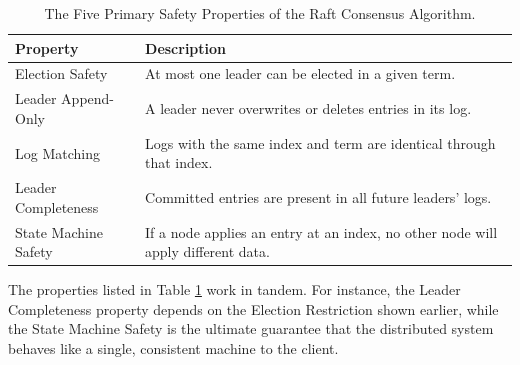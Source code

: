 \begin{table}[h]
\centering
\caption{The Five Primary Safety Properties of the Raft Consensus Algorithm.}
\label{tab:raft_safety_properties}
\begin{tabularx}{\textwidth}{|l|X|}
\hline
\textbf{Property} & \textbf{Description} \\ \hline
Election Safety & At most one leader can be elected in a given term. \\ \hline
Leader Append-Only & A leader never overwrites or deletes entries in its log. \\ \hline
Log Matching & Logs with the same index and term are identical through that index. \\ \hline
Leader Completeness & Committed entries are present in all future leaders' logs. \\ \hline
State Machine Safety & If a node applies an entry at an index, no other node will apply different data. \\ \hline
\end{tabularx}
\end{table}

The properties listed in Table \ref{tab:raft_safety_properties} work in tandem. For instance, the Leader Completeness property depends on the Election Restriction shown earlier, while the State Machine Safety is the ultimate guarantee that the distributed system behaves like a single, consistent machine to the client.